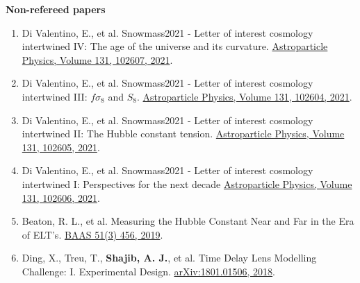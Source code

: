 \documentclass[margin, line]{res}
\begin{document}
\begin{resume}
\textbf{Non-refereed papers}
\begin{enumerate}
	\item Di Valentino, E., et al. Snowmass2021 - Letter of interest cosmology intertwined IV: The age of the universe and its curvature. \href{https://www.sciencedirect.com/science/article/abs/pii/S0927650521000517}{Astroparticle Physics, Volume 131, 102607, 2021}.
	\item Di Valentino, E., et al. Snowmass2021 - Letter of interest cosmology intertwined III: $f\sigma_8$ and $S_8$. \href{https://www.sciencedirect.com/science/article/abs/pii/S0927650521000487}{Astroparticle Physics, Volume 131, 102604, 2021}.
	\item Di Valentino, E., et al. Snowmass2021 - Letter of interest cosmology intertwined II: The Hubble constant tension. \href{https://www.sciencedirect.com/science/article/abs/pii/S0927650521000499}{Astroparticle Physics, Volume 131, 102605, 2021}.
	\item Di Valentino, E., et al. Snowmass2021 - Letter of interest cosmology intertwined I: Perspectives for the next decade \href{https://www.sciencedirect.com/science/article/abs/pii/S0927650521000505}{Astroparticle Physics, Volume 131, 102606, 2021}.
	\item Beaton, R. L., et al. Measuring the Hubble Constant Near and Far in the Era of ELT's. \href{https://ui.adsabs.harvard.edu/abs/2019BAAS...51c.456B/abstract}{BAAS 51(3) 456, 	2019}.
	\item Ding, X., Treu, T., {\bf Shajib, A. J.}, et al. Time Delay Lens Modelling Challenge: I. Experimental Design. \href{https://arxiv.org/abs/1801.01506}{arXiv:1801.01506, 2018}.

\end{enumerate}







\end{resume}
\end{document}
